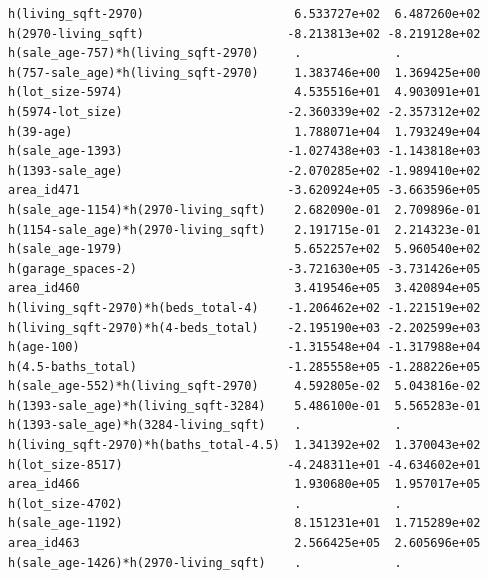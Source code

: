 \documentclass[
]{article}
\begin{document}
\begin{verbatim}
h(living_sqft-2970)                     6.533727e+02  6.487260e+02
h(2970-living_sqft)                    -8.213813e+02 -8.219128e+02
h(sale_age-757)*h(living_sqft-2970)     .             .           
h(757-sale_age)*h(living_sqft-2970)     1.383746e+00  1.369425e+00
h(lot_size-5974)                        4.535516e+01  4.903091e+01
h(5974-lot_size)                       -2.360339e+02 -2.357312e+02
h(39-age)                               1.788071e+04  1.793249e+04
h(sale_age-1393)                       -1.027438e+03 -1.143818e+03
h(1393-sale_age)                       -2.070285e+02 -1.989410e+02
area_id471                             -3.620924e+05 -3.663596e+05
h(sale_age-1154)*h(2970-living_sqft)    2.682090e-01  2.709896e-01
h(1154-sale_age)*h(2970-living_sqft)    2.191715e-01  2.214323e-01
h(sale_age-1979)                        5.652257e+02  5.960540e+02
h(garage_spaces-2)                     -3.721630e+05 -3.731426e+05
area_id460                              3.419546e+05  3.420894e+05
h(living_sqft-2970)*h(beds_total-4)    -1.206462e+02 -1.221519e+02
h(living_sqft-2970)*h(4-beds_total)    -2.195190e+03 -2.202599e+03
h(age-100)                             -1.315548e+04 -1.317988e+04
h(4.5-baths_total)                     -1.285558e+05 -1.288226e+05
h(sale_age-552)*h(living_sqft-2970)     4.592805e-02  5.043816e-02
h(1393-sale_age)*h(living_sqft-3284)    5.486100e-01  5.565283e-01
h(1393-sale_age)*h(3284-living_sqft)    .             .           
h(living_sqft-2970)*h(baths_total-4.5)  1.341392e+02  1.370043e+02
h(lot_size-8517)                       -4.248311e+01 -4.634602e+01
area_id466                              1.930680e+05  1.957017e+05
h(lot_size-4702)                        .             .           
h(sale_age-1192)                        8.151231e+01  1.715289e+02
area_id463                              2.566425e+05  2.605696e+05
h(sale_age-1426)*h(2970-living_sqft)    .             .           
                                                                  

\end{verbatim}
\end{document}
